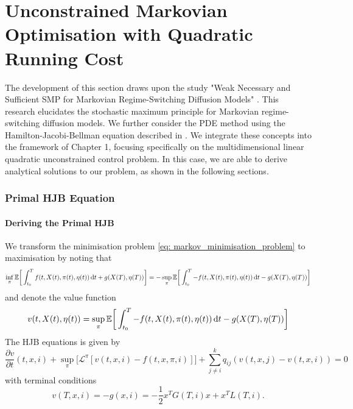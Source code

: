 \chapter{Unconstrained Markovian Optimisation with Quadratic Running Cost}

The development of this section draws upon the study "Weak Necessary and Sufficient SMP for Markovian Regime-Switching Diffusion Models" \cite{Weak_Necessary_and_Sufficient_SMP_for_Markovian_Regime-Switching_Diffusion_Models}. This research elucidates the stochastic maximum principle for Markovian regime-switching diffusion models. We further consider the PDE method using the Hamilton-Jacobi-Bellman equation described in \cite{Pham}. We integrate these concepts into the framework of Chapter 1, focusing specifically on the multidimensional linear quadratic unconstrained control problem. In this case, we are able to derive analytical solutions to our problem, as shown in the following sections.


 \subsection{Primal HJB Equation}
\subsubsection{Deriving the Primal HJB}
We transform the minimisation problem \eqref{eq: markov_minimisation_problem} to maximisation by noting that
\begin{equation*}
    \inf_{\pi} \mathbb{E} \bigg[ \int_{t_0}^T f(t, X(t), \pi(t), \eta(t)) \mathop{}\!\mathrm{d} t + g(X(T), \eta(T)) \bigg] = - \sup_{\pi} \mathbb{E} \bigg[ \int_{t_0}^T -f(t, X(t), \pi(t), \eta(t)) \mathop{}\!\mathrm{d} t - g(X(T), \eta(T)) \bigg]
\end{equation*}
and denote the value function
\begin{equation}
    v(t, X(t), \eta(t)) = \sup_{\pi} \mathbb{E} \bigg[ \int_{t_0}^T -f(t, X(t), \pi(t), \eta(t)) \mathop{}\!\mathrm{d} t - g(X(T), \eta(T)) \bigg]
\end{equation}
The HJB equations is given by
\begin{equation}
    \frac{\partial v}{\partial t} (t,x, i) + \sup_{\pi} \big[ \mathcal{L}^\pi[v(t,x,i) - f(t, x, \pi, i)] \big] + \sum_{j \ne i}^k q_{ij} (v(t,x,j) - v(t,x,i)) = 0 \label{eq: markov_hjb}
\end{equation}
with terminal conditions
\begin{equation*}
    v(T, x, i) = - g(x, i) = - \frac{1}{2} x^T G(T, i) x + x^T L(T, i).
\end{equation*}
